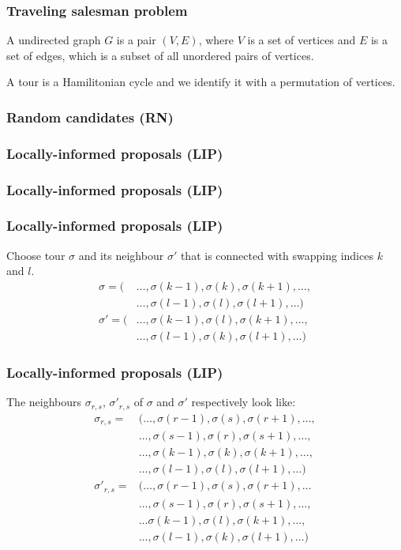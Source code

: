 \begin{frame}
	\frametitle{Traveling salesman problem}
	\begin{definition}
		A undirected graph $G$ is a pair $(V, E)$, where $V$ is a set of vertices and $E$ is a set of edges, which is a subset of all unordered pairs of vertices.
	\end{definition}
	\begin{definition}
		A tour is a Hamilitonian cycle and we identify it with a permutation of vertices.
	\end{definition}
\end{frame}

\begin{frame}
	\frametitle{Random candidates (RN)}
	
\end{frame}

\begin{frame}
	\frametitle{Locally-informed proposals (LIP)}
	
\end{frame}

\begin{frame}
	\frametitle{Locally-informed proposals (LIP)}
	
\end{frame}

\begin{frame}
	\frametitle{Locally-informed proposals (LIP)}
	Choose tour $\sigma$ and its neighbour $\sigma'$ that is connected with swapping indices $k$ and $l$.
	\begin{align*}
	\sigma = (&\ldots, \sigma(k-1), \sigma(k), \sigma(k+1), \ldots, \\
	&\ldots, \sigma(l-1), \sigma(l), \sigma(l+1), \ldots) \\
	\sigma' = (&\ldots, \sigma(k-1), \sigma(l), \sigma(k+1), \ldots, \\
	&\ldots, \sigma(l-1), \sigma(k), \sigma(l+1), \ldots)
	\end{align*}
\end{frame}

\begin{frame}
	\frametitle{Locally-informed proposals (LIP)}
	The neighbours $\sigma_{r,s}$, $\sigma'_{r,s}$ of $\sigma$ and $\sigma'$ respectively look like: 
	\begin{align*}
	\sigma_{r,s} = &(\ldots, \sigma(r-1), \sigma(s), \sigma(r+1), \ldots, \\
	&\ldots, \sigma(s-1), \sigma(r),\sigma(s+1), \ldots, \\
	&\ldots, \sigma(k-1), \sigma(k), \sigma(k+1), \ldots, \\
	& \ldots, \sigma(l-1), \sigma(l), \sigma(l+1), \ldots) \\
	\sigma'_{r,s} = &(\ldots, \sigma(r-1), \sigma(s), \sigma(r+1), \ldots \\
	& \ldots, \sigma(s-1), \sigma(r), \sigma(s+1), \ldots, \\
	&\ldots \sigma(k-1), \sigma(l), \sigma(k+1), \ldots, \\
	& \ldots, \sigma(l-1), \sigma(k), \sigma(l+1), \ldots)
	\end{align*}
\end{frame}

